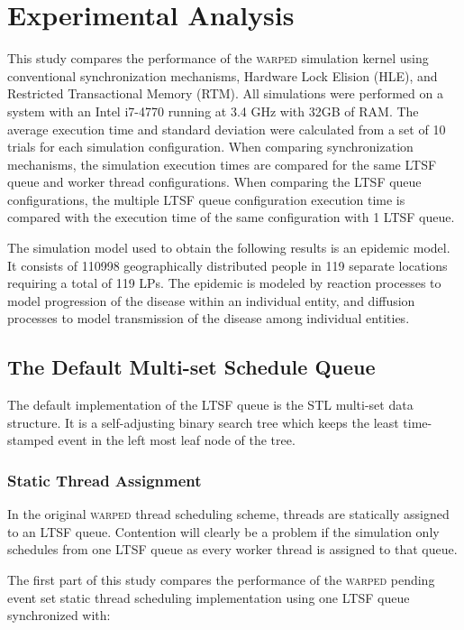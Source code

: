 \documentclass{sig-alternate}
\begin{document}
\section{Experimental Analysis}\label{eval}

This study compares the performance of the \textsc{warped} simulation kernel using
conventional synchronization mechanisms, Hardware Lock Elision (HLE), and Restricted
Transactional Memory (RTM).  All simulations were performed on a system with an Intel
i7-4770 running at 3.4 GHz with 32GB of RAM.  The average execution time and standard
deviation were calculated from a set of 10 trials for each simulation configuration.  When
comparing synchronization mechanisms, the simulation execution times are compared for the
same LTSF queue and worker thread configurations.  When comparing the LTSF queue
configurations, the multiple LTSF queue configuration execution time is compared with the
execution time of the same configuration with 1 LTSF queue.

The simulation model used to obtain the following results is an epidemic model.  It
consists of 110998 geographically distributed people in 119 separate locations requiring a
total of 119 LPs.  The epidemic is modeled by reaction processes to model progression of
the disease within an individual entity, and diffusion processes to model transmission of
the disease among individual entities.

\subsection{The Default Multi-set Schedule Queue}

The default implementation of the LTSF queue is the STL multi-set data structure.  It is a
self-adjusting binary search tree which keeps the least time-stamped event in the left
most leaf node of the tree.

\subsubsection{Static Thread Assignment}

In the original \textsc{warped} thread scheduling scheme, threads are statically assigned
to an LTSF queue.  Contention will clearly be a problem if the simulation only schedules
from one LTSF queue as every worker thread is assigned to that queue.

The first part of this study compares the performance of the \textsc{warped} pending event
set static thread scheduling implementation using one LTSF queue synchronized with: 
\end{document}
